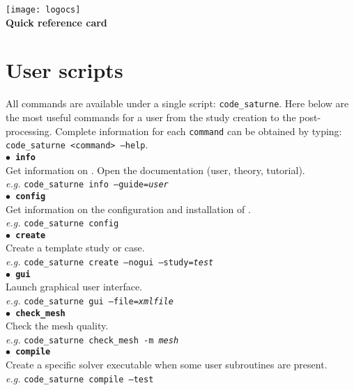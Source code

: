 \documentclass[a4paper,11pt]{article}
\newcommand{\refword}[1]{\texttt{$\bullet$ \bf{#1}}}
\begin{document}
\begin{multicols*}{3}

\begin{center}
  \texttt{[image: logocs]}
  {\Large {\bf \CS~\verscs\\Quick reference card}}
\end{center}


\section*{User scripts}

All \CS commands are available under a single script: \texttt{code\_saturne}.
Here below are the most useful commands for a \CS user from the study
creation to the post-processing. Complete information for each
\texttt{command} can be obtained by typing:\\
\texttt{code\_saturne <command> --help}.\\

\refword{info}\\
Get information on \CS. Open the documentation (user, theory,
tutorial).\\
\textit{e.g.} \texttt{code\_saturne info --guide=\emph{user}}\\

\refword{config}\\
Get information on the configuration and installation of \CS.\\
\textit{e.g.} \texttt{code\_saturne config}\\

\refword{create}\\
Create a \CS template study or case.\\
\textit{e.g.} \texttt{code\_saturne create --nogui --study=\emph{test}}\\

\refword{gui}\\
Launch \CS graphical user interface.\\
\textit{e.g.} \texttt{code\_saturne gui --file=\emph{xmlfile}}\\

\refword{check\_mesh}\\
Check the mesh quality.\\
\textit{e.g.} \texttt{code\_saturne check\_mesh -m \emph{mesh}}\\

\refword{compile}\\
Create a specific solver executable when some user subroutines are
present.\\
\textit{e.g.} \texttt{code\_saturne compile --test}\\


\end{multicols*}
\end{document}
